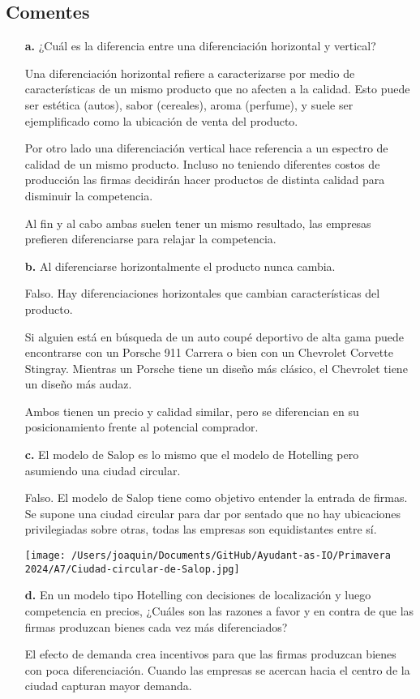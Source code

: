 \documentclass{exam}
\begin{document}
    \subsection{Comentes}
    \begin{itemize}
    \item[\textbf{a.}] ¿Cuál es la diferencia entre una diferenciación horizontal y vertical?
    \begin{solution}
        Una diferenciación horizontal refiere a caracterizarse por medio de características de un mismo producto que no afecten a la calidad. Esto puede ser estética (autos), sabor (cereales), aroma (perfume), y suele ser ejemplificado como la ubicación de venta del producto.

        Por otro lado una diferenciación vertical hace referencia a un espectro de calidad de un mismo producto. Incluso no teniendo diferentes costos de producción las firmas decidirán hacer productos de distinta calidad para disminuir la competencia.

        Al fin y al cabo ambas suelen tener un mismo resultado, las empresas prefieren diferenciarse para relajar la competencia.
    \end{solution}
    \item[\textbf{b.}] Al diferenciarse horizontalmente el producto nunca cambia.
    \begin{solution}
        Falso. Hay diferenciaciones horizontales que cambian características del producto. 

        Si alguien está en búsqueda de un auto coupé deportivo de alta gama puede encontrarse con un Porsche 911 Carrera o bien con un Chevrolet Corvette Stingray. Mientras un Porsche tiene un diseño más clásico, el Chevrolet tiene un diseño más audaz. 

        Ambos tienen un precio y calidad similar, pero se diferencian en su posicionamiento frente al potencial comprador.
    \end{solution}
    \item[\textbf{c.}] El modelo de Salop es lo mismo que el modelo de Hotelling pero asumiendo una ciudad circular.
    \begin{solution}
        Falso. El modelo de Salop tiene como objetivo entender la entrada de firmas. Se supone una ciudad circular para dar por sentado que no hay ubicaciones privilegiadas sobre otras, todas las empresas son equidistantes entre sí. 
        \begin{center}
            \texttt{[image: /Users/joaquin/Documents/GitHub/Ayudant-as-IO/Primavera 2024/A7/Ciudad-circular-de-Salop.jpg]}
        \end{center}
    \end{solution}
    \item[\textbf{d.}] En un modelo tipo Hotelling con decisiones de localización y luego competencia en precios, ¿Cuáles son las razones a favor y en contra de que las firmas produzcan bienes cada vez más diferenciados?
    \begin{solution}
        El efecto de demanda crea incentivos para que las firmas produzcan bienes con poca diferenciación. Cuando las empresas se acercan hacia el centro de la ciudad capturan mayor demanda.
        

\end{solution}
\end{itemize}
\end{document}
